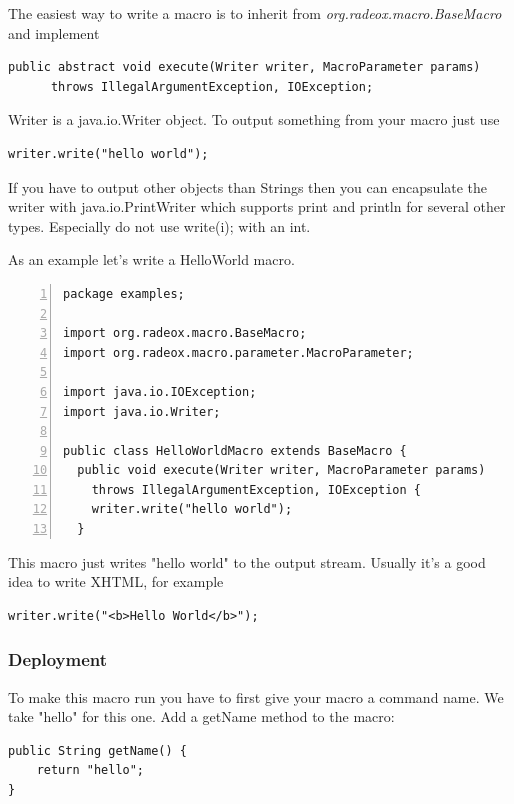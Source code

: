 \documentclass[a4paper,pdftex]{article}
\begin{document}
The easiest way to write a macro is to inherit from {\it org.radeox.macro.BaseMacro}
and implement

\begin{verbatim}
public abstract void execute(Writer writer, MacroParameter params)
      throws IllegalArgumentException, IOException;
 \end{verbatim}
 
Writer is a java.io.Writer object. To output something from your macro just use

\begin{verbatim}
writer.write("hello world"); 
\end{verbatim}

If you have to output other objects than Strings then you can encapsulate
the writer with java.io.PrintWriter which supports print and println for 
several other types. Especially do not use write(i); with an int.

As an example let's write a HelloWorld macro.

\begin{Verbatim}[gobble=0,frame=single,numbers=left,fontsize=\small]
package examples;

import org.radeox.macro.BaseMacro;
import org.radeox.macro.parameter.MacroParameter;

import java.io.IOException;
import java.io.Writer;

public class HelloWorldMacro extends BaseMacro {
  public void execute(Writer writer, MacroParameter params)
    throws IllegalArgumentException, IOException {
    writer.write("hello world");
  }

\end{Verbatim}

This macro just writes "hello world" to the output stream. Usually it's a good idea 
to write XHTML, for example

\begin{verbatim}
writer.write("<b>Hello World</b>");
\end{verbatim}

\subsubsection{Deployment}

To make this macro run you have to first give your macro a command name. We take "hello" for this one. Add a getName method to the macro:

\begin{verbatim}
public String getName() {
    return "hello";
}
\end{verbatim}
\end{document}
